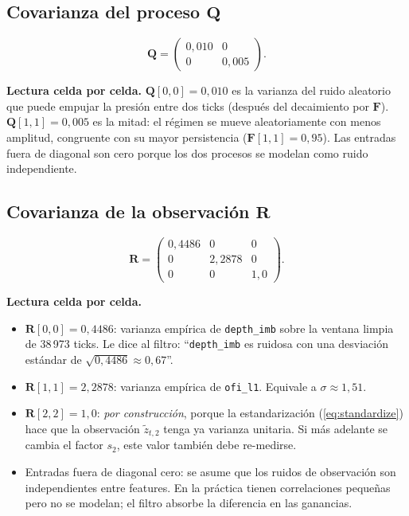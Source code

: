 \documentclass[journal,onecolumn,11pt]{IEEEtran}
\newcommand{\Fm}{\mathbf{F}}
\newcommand{\Qm}{\mathbf{Q}}
\newcommand{\Rm}{\mathbf{R}}
\begin{document}
\subsection{Covarianza del proceso $\Qm$}

\begin{equation}
\Qm = \begin{pmatrix}0{,}010 & 0 \\ 0 & 0{,}005\end{pmatrix}.
\label{eq:Qmatrix}
\end{equation}

\noindent
\textbf{Lectura celda por celda.}
$\Qm[0,0]\!=\!0{,}010$ es la varianza del ruido aleatorio que puede
empujar la presión entre dos ticks (después del decaimiento por $\Fm$).
$\Qm[1,1]\!=\!0{,}005$ es la mitad: el régimen se mueve aleatoriamente
con menos amplitud, congruente con su mayor persistencia
($\Fm[1,1]\!=\!0{,}95$). Las entradas fuera de diagonal son cero porque
los dos procesos se modelan como ruido independiente.

\subsection{Covarianza de la observación $\Rm$}

\begin{equation}
\Rm = \begin{pmatrix}0{,}4486 & 0 & 0 \\ 0 & 2{,}2878 & 0 \\ 0 & 0 & 1{,}0\end{pmatrix}.
\label{eq:Rmatrix}
\end{equation}

\noindent
\textbf{Lectura celda por celda.}
\begin{itemize}
\item $\Rm[0,0]=0{,}4486$: varianza empírica de \texttt{depth\_imb}
      sobre la ventana limpia de 38\,973 ticks. Le dice al filtro:
      ``\texttt{depth\_imb} es ruidosa con una desviación estándar de
      $\sqrt{0{,}4486}\approx 0{,}67$''.
\item $\Rm[1,1]=2{,}2878$: varianza empírica de \texttt{ofi\_l1}.
      Equivale a $\sigma\approx 1{,}51$.
\item $\Rm[2,2]=1{,}0$: \emph{por construcción}, porque la
      estandarización (\ref{eq:standardize}) hace que la observación
      $\tilde{z}_{t,2}$ tenga ya varianza unitaria. Si más adelante se
      cambia el factor $s_2$, este valor también debe re-medirse.
\item Entradas fuera de diagonal cero: se asume que los ruidos de
      observación son independientes entre features. En la práctica
      tienen correlaciones pequeñas pero no se modelan; el filtro
      absorbe la diferencia en las ganancias.
\end{itemize}
\end{document}
